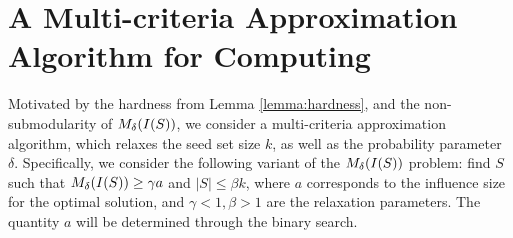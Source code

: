 
\vspace{-0.1in}
\section{A Multi-criteria Approximation Algorithm for Computing \infprob{}}
\label{sec:algo}
\vspace{-0.05in}

Motivated by the hardness from Lemma \ref{lemma:hardness}, and the non-submodularity of $\mbox{$M_{\delta}(I(S))$}$, we consider a multi-criteria approximation algorithm, which relaxes the seed set size $k$, as well as the probability parameter $\delta$.
Specifically, we consider the following variant of the $\mbox{$M_{\delta}(I(S))$}$ problem: find $S$ such that $\mbox{$M_{\delta}(I(S))$} \geq \gamma a $ and $|S| \leq \beta k$, where $a$ corresponds to the influence size for the optimal solution, and $\gamma < 1, \beta > 1$ are the relaxation parameters. The quantity $a$ will be determined through the binary search.


